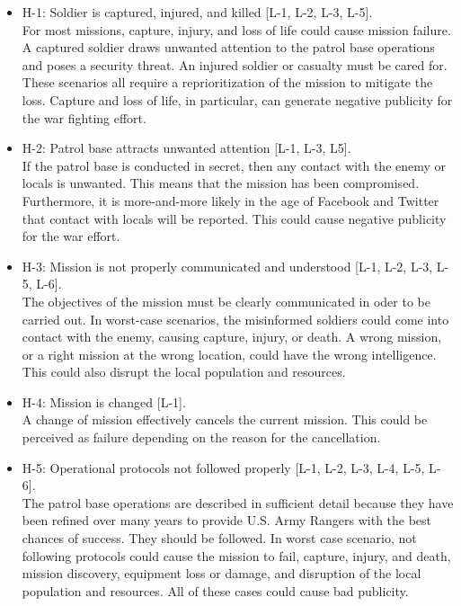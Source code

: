 \documentclass[../../main/main.tex]{subfiles}
\begin{document}
\begin{itemize}
\item H-1: Soldier is captured, injured, and killed [L-1, L-2, L-3, L-5].\\
For most missions, capture, injury, and loss of life could cause mission failure.  A captured soldier draws unwanted attention to the patrol base operations and poses a security threat.  An injured soldier or casualty must be cared for.  These scenarios all require a reprioritization of the mission to mitigate the loss.  Capture and loss of life, in particular, can generate negative publicity for the war fighting effort. 

\item H-2: Patrol base attracts unwanted attention [L-1, L-3, L5].\\
If the patrol base is conducted in secret, then any contact with the enemy or locals is unwanted.  This means that the mission has been compromised.  Furthermore, it is more-and-more likely in the age of Facebook and Twitter that contact with locals will be reported.  This could cause negative publicity for the war effort. 

\item H-3: Mission is not properly communicated and understood [L-1, L-2, L-3, L-5, L-6].\\
The objectives of the mission must be clearly communicated in oder to be carried out.  In worst-case scenarios, the misinformed soldiers could come into contact with the enemy, causing capture, injury, or death.  A wrong mission, or a right mission at the wrong location, could have the wrong intelligence.  This could also disrupt the local population and resources.

\item H-4: Mission is changed [L-1].\\
A change of mission effectively cancels the current mission. This could be perceived as failure depending on the reason for the cancellation.

\item H-5: Operational protocols not followed properly [L-1, L-2, L-3, L-4, L-5, L-6].\\
The patrol base operations are described in sufficient detail because they have been refined over many years to provide U.S. Army Rangers with the best chances of success.  They should be followed.  In worst case scenario, not following protocols could cause the mission to fail, capture, injury, and death, mission discovery, equipment loss or damage, and disruption of the local population and resources.  All of these cases could cause bad publicity.


\end{itemize}
\end{document}
